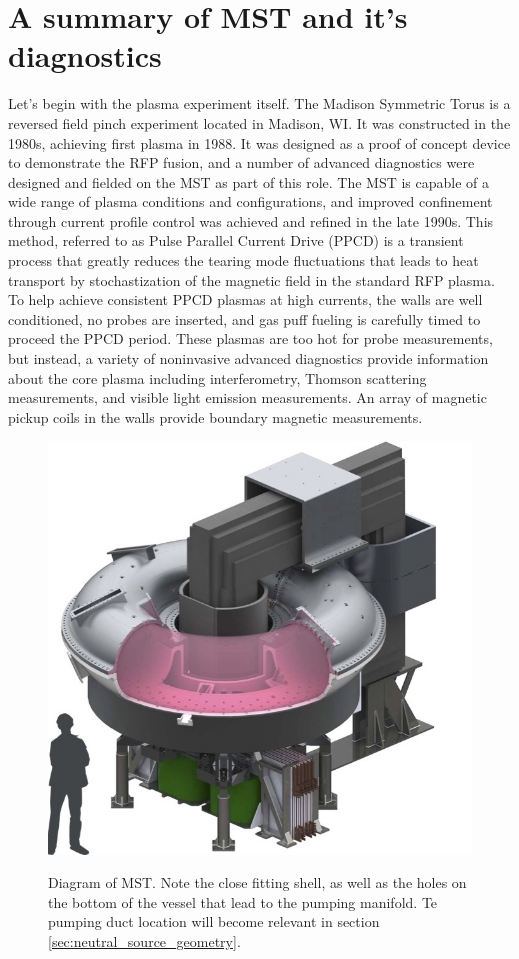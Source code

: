 \section{A summary of MST and it's diagnostics}\label{sec:MST}
Let's begin with the plasma experiment itself. The Madison Symmetric Torus is a reversed field pinch experiment located in Madison, WI. It was constructed in the 1980s, achieving first plasma in 1988\cite{Dexter1991}. It was designed as a proof of concept device to demonstrate the RFP fusion\cite{Najmabadi1999}, and a number of advanced diagnostics were designed and fielded on the MST as part of this role. The MST is capable of a wide range of plasma conditions and configurations, and improved confinement through current profile control was achieved and refined in the late 1990s\cite{Sarff1995, Chapman2002}. This method, referred to as Pulse Parallel Current Drive (PPCD) is a transient process that greatly reduces the tearing mode fluctuations that %
leads to heat transport by stochastization of the magnetic field in the standard RFP plasma.
To help achieve consistent PPCD plasmas at high currents, the walls are well conditioned, no probes are inserted, and gas puff fueling is carefully timed to proceed the PPCD period. These plasmas are too hot for probe measurements, but instead, a variety of noninvasive advanced diagnostics provide information about the core plasma including interferometry, Thomson scattering measurements, and visible light emission measurements. An array of magnetic pickup coils in the walls provide boundary magnetic measurements. 

\begin{figure}[!htb]
	\centering
	\includegraphics{./implementation/MST_model_diagram}
	\label{fig:MST_diagram}
	\caption[Diagram of MST]{Diagram of MST. Note the close fitting shell, as well as the holes on the bottom of the vessel that lead to the pumping manifold. Te pumping duct location will become relevant in section \ref{sec:neutral_source_geometry}.}
\end{figure}

